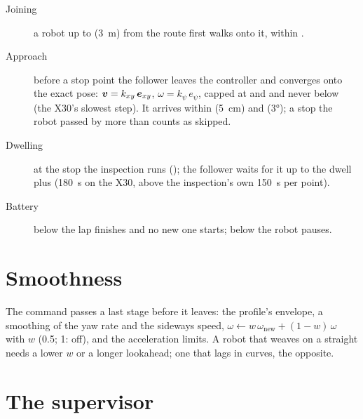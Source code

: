 \begin{description}
  \item[Joining] a robot up to  (\SI{3}{m}) from the route first walks onto
    it, within .
  \item[Approach]  before a stop point the follower leaves the controller
    and converges onto the exact pose: $\boldsymbol{v} = k_{xy}\,\boldsymbol{e}_{xy}$, $\omega = k_\psi\,
    e_\psi$, capped at  and  and never below
     (the X30's slowest step). It arrives within
     (\SI{5}{cm}) and  (\ang{3}); a stop the
    robot passed by more than  counts as skipped.
  \item[Dwelling] at the stop the inspection runs (); the follower waits
    for it up to the dwell plus  (\SI{180}{s} on the X30,
    above the inspection's own \SI{150}{s} per point).
  \item[Battery] below  the lap finishes and no new one starts; below
     the robot pauses.
\end{description}

\section{Smoothness}

The command passes a last stage before it leaves: the profile's envelope, a smoothing of the yaw
rate and the sideways speed,
$\omega \leftarrow w\,\omega_{\text{new}} + (1-w)\,\omega$ with $w$ 
(\num{0.5}; 1: off), and the acceleration limits. A robot that weaves on a straight needs a
lower $w$ or a longer lookahead; one that lags in curves, the opposite.

\section{The supervisor}

